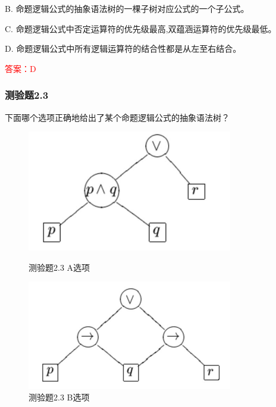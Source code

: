 \documentclass[UTF8, heading=true]{ctexart}
\begin{document}
B. 命题逻辑公式的抽象语法树的一棵子树对应公式的一个子公式。

C. 命题逻辑公式中否定运算符的优先级最高,双蕴涵运算符的优先级最低。

D. 命题逻辑公式中所有逻辑运算符的结合性都是从左至右结合。

\textcolor{red}{答案：D}

\subsubsection{测验题2.3}

下面哪个选项正确地给出了某个命题逻辑公式的抽象语法树？

\begin{figure}[htbp]
    \centering
    \begin{minipage}[t]{0.45\textwidth}
        \centering
        \includegraphics[width=0.8\textwidth]{2.3_1.jpg} %
        \caption{测验题2.3 A选项}
    \end{minipage}
    \hfill
    \begin{minipage}[t]{0.45\textwidth}
        \centering
        \includegraphics[width=0.8\textwidth]{2.3_2.jpg} %
        \caption{测验题2.3 B选项}
\end{minipage}
\end{figure}
\end{document}
